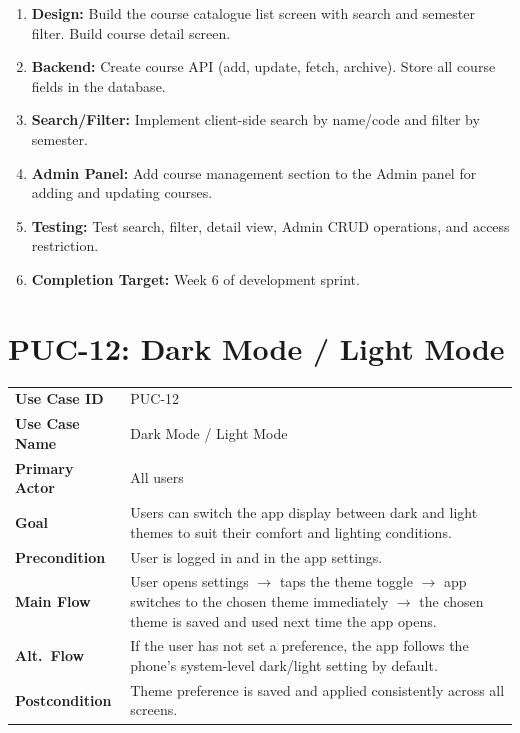 \documentclass[12pt,a4paper]{article}
\begin{document}
\begin{tcolorbox}[planbox, title={Completion Plan --- PUC-11}]
\begin{enumerate}[leftmargin=*, label=\textbf{Step \arabic*:}, itemsep=4pt]
  \item \textbf{Design:} Build the course catalogue list screen with search and semester filter. Build course detail screen.
  \item \textbf{Backend:} Create course API (add, update, fetch, archive). Store all course fields in the database.
  \item \textbf{Search/Filter:} Implement client-side search by name/code and filter by semester.
  \item \textbf{Admin Panel:} Add course management section to the Admin panel for adding and updating courses.
  \item \textbf{Testing:} Test search, filter, detail view, Admin CRUD operations, and access restriction.
  \item \textbf{Completion Target:} Week 6 of development sprint.
\end{enumerate}
\end{tcolorbox}

\newpage
\section{PUC-12: Dark Mode / Light Mode}

\begin{tcolorbox}[pucbox, title={Product Use Case --- PUC-12}]
\begin{tabularx}{\linewidth}{p{3.5cm} X}
\textbf{Use Case ID}    & PUC-12 \\
\textbf{Use Case Name}  & Dark Mode / Light Mode \\
\textbf{Primary Actor}  & All users \\
\textbf{Goal}           & Users can switch the app display between dark and light themes to suit their comfort and lighting conditions. \\
\textbf{Precondition}   & User is logged in and in the app settings. \\
\textbf{Main Flow}      & User opens settings $\rightarrow$ taps the theme toggle $\rightarrow$ app switches to the chosen theme immediately $\rightarrow$ the chosen theme is saved and used next time the app opens. \\
\textbf{Alt.\ Flow}     & If the user has not set a preference, the app follows the phone's system-level dark/light setting by default. \\
\textbf{Postcondition}  & Theme preference is saved and applied consistently across all screens. \\
\end{tabularx}
\end{tcolorbox}
\end{document}
